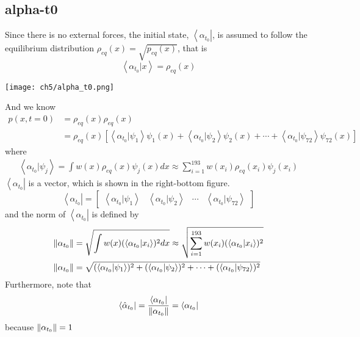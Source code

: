 \subsection{alpha-t0}
\begin{definition}
Since there is no external forces, the initial state, $\left< \alpha_{t_0} \right|$, is assumed to follow the equilibrium distribution $\rho_{eq}(x)=\sqrt{p_{eq}(x)}$, that is
\begin{equation}
        \left< \alpha_{t_0} | x \right> = \rho_{eq}(x)
\end{equation}
\begin{center}
        \texttt{[image: ch5/alpha\_t0.png]}   
\end{center}
And we know
\begin{align*}
        p(x,t=0) &= \rho_{eq}(x) \rho_{eq}(x)\\
        &= \rho_{eq}(x)[\left< \alpha_{t_0} | \psi_1 \right> \psi_1(x) + \left< \alpha_{t_0} | \psi_2 \right>\psi_2(x)+\cdots+\left< \alpha_{t_0} | \psi_{72} \right>\psi_{72}(x)]       
\end{align*}
where
\begin{align*}
        \left< \alpha_{t_0} | \psi_j \right> = \int w(x) \rho_{eq}(x) \psi_j(x) dx \approx \sum_{i=1}^{193} w(x_i) \rho_{eq}(x_i) \psi_j(x_i)
\end{align*}
$\left< \alpha_{t_0} \right|$ is a vector, which is shown in the right-bottom figure.
\begin{equation}
        \left< \alpha_{t_0} \right| = \begin{bmatrix}\left< \alpha_{t_0} | \psi_1 \right> & \left< \alpha_{t_0} | \psi_2 \right> & \cdots & \left< \alpha_{t_0} | \psi_{72} \right> \end{bmatrix}
\end{equation}
and the norm of $\left< \alpha_{t_0} \right|$ is defined by
\begin{align}
        \left\lVert\alpha_{t_0}\right\rVert &=  \sqrt{\int w(x) (\left< \alpha_{t_0} | x_i \right>)^2 dx} \approx \sqrt{ \sum_{i=1}^{193} w(x_i) (\left< \alpha_{t_0} | x_i \right>)^2 } \\
        \left\lVert\alpha_{t_0}\right\rVert &= \sqrt{(\left< \alpha_{t_0} | \psi_1 \right>)^2 + (\left< \alpha_{t_0} | \psi_2 \right>)^2 +\cdots + (\left< \alpha_{t_0} | \psi_{72} \right>)^2}
\end{align}
Furthermore, note that
\begin{equation}
        \left< \hat{\alpha}_{t_0} \right| = \frac{\left< \alpha_{t_{0}} \right|}{\left\lVert\alpha_{t_{0}}\right\rVert} = \left< \alpha_{t_{0}} \right|
\end{equation}
because $\left\lVert\alpha_{t_0}\right\rVert = 1$
\end{definition}

